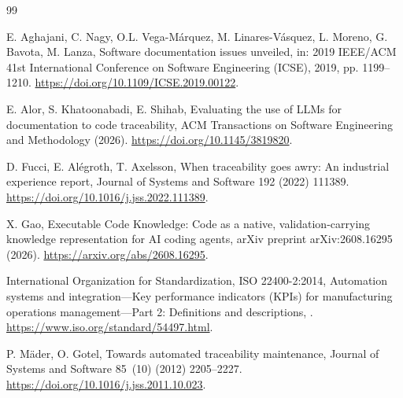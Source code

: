 \documentclass[a4paper,fleqn]{cas-dc}
\begin{document}





\begin{thebibliography}{99}


E. Aghajani, C. Nagy, O.L. Vega-M\'arquez, M. Linares-V\'asquez, L. Moreno, G. Bavota, M. Lanza,
\newblock Software documentation issues unveiled,
\newblock in: 2019 IEEE/ACM 41st International Conference on Software Engineering (ICSE), 2019, pp. 1199--1210.
\newblock \url{https://doi.org/10.1109/ICSE.2019.00122}.

E. Alor, S. Khatoonabadi, E. Shihab,
\newblock Evaluating the use of LLMs for documentation to code traceability,
\newblock ACM Transactions on Software Engineering and Methodology (2026).
\newblock \url{https://doi.org/10.1145/3819820}.

D. Fucci, E. Al\'egroth, T. Axelsson,
\newblock When traceability goes awry: An industrial experience report,
\newblock Journal of Systems and Software 192 (2022) 111389.
\newblock \url{https://doi.org/10.1016/j.jss.2022.111389}.

X. Gao,
\newblock Executable Code Knowledge: Code as a native, validation-carrying knowledge representation for AI coding agents,
\newblock arXiv preprint arXiv:2608.16295 (2026).
\newblock \url{https://arxiv.org/abs/2608.16295}.

International Organization for Standardization,
\newblock ISO 22400-2:2014, Automation systems and integration---Key performance indicators (KPIs) for manufacturing operations management---Part 2: Definitions and descriptions,
.
\newblock \url{https://www.iso.org/standard/54497.html}.

P. M\"ader, O. Gotel,
\newblock Towards automated traceability maintenance,
\newblock Journal of Systems and Software 85~(10) (2012) 2205--2227.
\newblock \url{https://doi.org/10.1016/j.jss.2011.10.023}.


\end{thebibliography}
\end{document}
